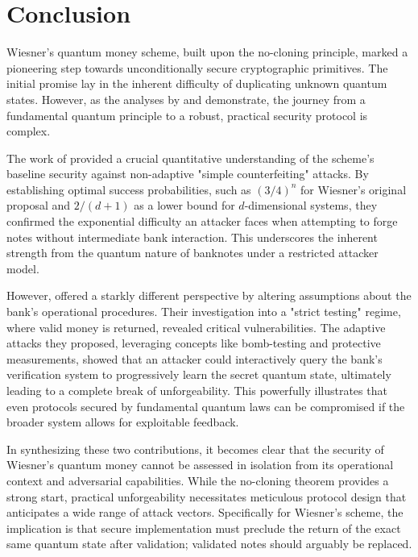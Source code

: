 \documentclass{article} %
\begin{document}
\section{Conclusion}
Wiesner's quantum money scheme, built upon the no-cloning principle, marked a pioneering step towards unconditionally secure cryptographic primitives. The initial promise lay in the inherent difficulty of duplicating unknown quantum states. However, as the analyses by \citet{Molina2012Optimal} and \citet{Nagaj2016Adaptive} demonstrate, the journey from a fundamental quantum principle to a robust, practical security protocol is complex.

The work of \citet{Molina2012Optimal} provided a crucial quantitative understanding of the scheme's baseline security against non-adaptive "simple counterfeiting" attacks. By establishing optimal success probabilities, such as $(3/4)^n$ for Wiesner's original proposal and $2/(d+1)$ as a lower bound for $d$-dimensional systems, they confirmed the exponential difficulty an attacker faces when attempting to forge notes without intermediate bank interaction. This underscores the inherent strength from the quantum nature of banknotes under a restricted attacker model.

However, \citet{Nagaj2016Adaptive} offered a starkly different perspective by altering assumptions about the bank's operational procedures. Their investigation into a "strict testing" regime, where valid money is returned, revealed critical vulnerabilities. The adaptive attacks they proposed, leveraging concepts like bomb-testing and protective measurements, showed that an attacker could interactively query the bank's verification system to progressively learn the secret quantum state, ultimately leading to a complete break of unforgeability. This powerfully illustrates that even protocols secured by fundamental quantum laws can be compromised if the broader system allows for exploitable feedback.
                                                                                                                                                         
In synthesizing these two contributions, it becomes clear that the security of Wiesner's quantum money cannot be assessed in isolation from its operational context and adversarial capabilities. While the no-cloning theorem provides a strong start, practical unforgeability necessitates meticulous protocol design that anticipates a wide range of attack vectors. Specifically for Wiesner's scheme, the implication is that secure implementation must preclude the return of the exact same quantum state after validation; validated notes should arguably be replaced.
\end{document}
